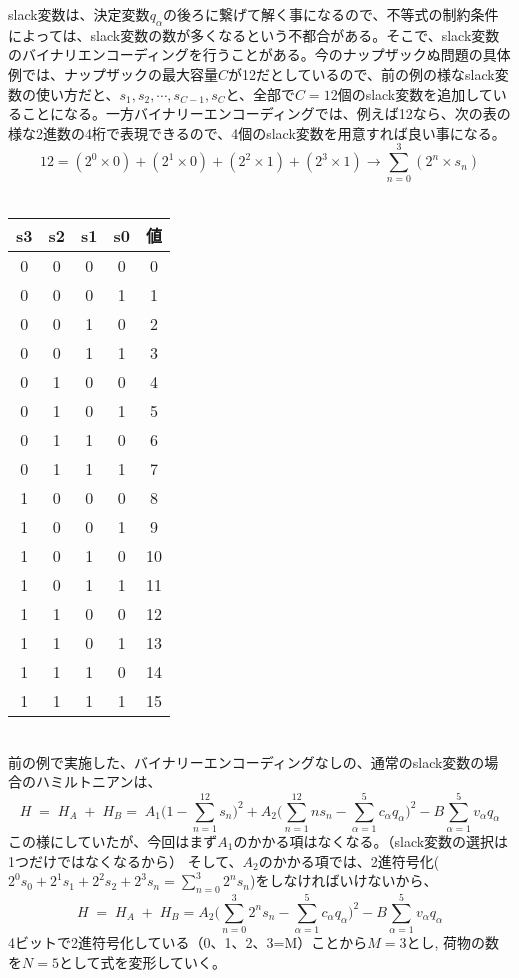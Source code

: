 \documentclass[uplatex,dvipdfmx,a4paper,11pt,oneside,openany]{jsbook}
\begin{document}
slack変数は、決定変数$q_\alpha$の後ろに繋げて解く事になるので、不等式の制約条件によっては、slack変数の数が多くなるという不都合がある。そこで、slack変数のバイナリエンコーディングを行うことがある。今のナップザックぬ問題の具体例では、ナップザックの最大容量$C$が12だとしているので、前の例の様なslack変数の使い方だと、$s_1, s_2,\cdots,s_{C-1}, s_C$と、全部で$C=12$個のslack変数を追加していることになる。一方バイナリーエンコーディングでは、例えば12なら、次の表の様な2進数の4桁で表現できるので、4個のslack変数を用意すれば良い事になる。\\
\[
12 = (2^0 \times 0) + (2^1 \times 0) + (2^2 \times 1) + (2^3 \times 1) \rightarrow \sum_{n=0}^3 (2^n \times s_n)
\]\\

\begin{tabular}{|c|c|c|c|c|}\hline
  s3&s2&s1&s0&値\\\hline
  0&0&0&0& 0\\
  0&0&0&1& 1\\
  0&0&1&0& 2\\
  0&0&1&1& 3\\
  0&1&0&0& 4\\
  0&1&0&1& 5\\
  0&1&1&0& 6\\
  0&1&1&1& 7\\
  1&0&0&0& 8\\
  1&0&0&1& 9\\
  1&0&1&0& 10\\
  1&0&1&1& 11\\
  1&1&0&0& 12\\\hline
  1&1&0&1& 13\\
  1&1&1&0& 14\\
  1&1&1&1& 15\\\hline
\end{tabular}\\

前の例で実施した、バイナリーエンコーディングなしの、通常のslack変数の場合のハミルトニアンは、
\[
  H\;=\;H_A\;+\;H_B
  =\;A_1\bigg(1-\sum_{n=1}^{12}s_n\bigg)^2 + A_2\bigg(\sum_{n=1}^{12}n s_n- \sum_{\alpha=1}^{5}c_\alpha q_\alpha\bigg)^2 - B\sum_{\alpha=1}^{5}v_\alpha q_\alpha
\]
この様にしていたが、今回はまず$A_1$のかかる項はなくなる。（slack変数の選択は1つだけではなくなるから）
そして、$A_2$のかかる項では、2進符号化($2^0 s_0 + 2^1 s_1 + 2^2 s_2 + 2^3 s_n=\sum_{n=0}^3 2^n s_n$)をしなければいけないから、
\[
  H\;=\;H_A\;+\;H_B
  =A_2\bigg(\sum_{n=0}^{3}2^n s_n- \sum_{\alpha=1}^{5}c_\alpha q_\alpha\bigg)^2 - B\sum_{\alpha=1}^{5}v_\alpha q_\alpha
\]
4ビットで2進符号化している（0、1、2、3=M）ことから$M=3$とし, 荷物の数を$N=5$として式を変形していく。
\end{document}
